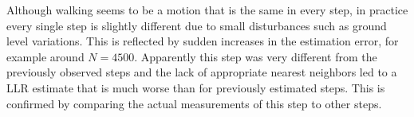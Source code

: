 Although walking seems to be a motion that is the same in every step, in practice every single step is slightly different due to small disturbances such as ground level variations. This is reflected by sudden increases in the estimation error, for example around $N=4500$. Apparently this step was very different from the previously observed steps and the lack of appropriate nearest neighbors led to a \ac{LLR} estimate that is much worse than for previously estimated steps. This is confirmed by comparing the actual measurements of this step to other steps.

\begin{figure}[htbp]
\centering
{}\\
\end{figure}
